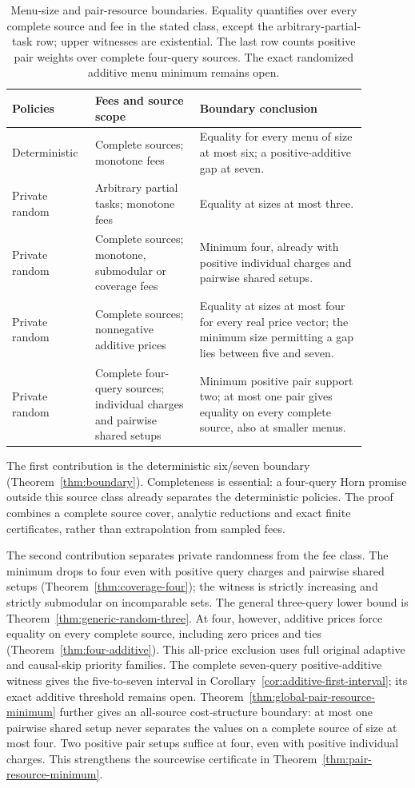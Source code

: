 \documentclass[pdflatex,sn-mathphys-num]{sn-jnl}
\theoremstyle{thmstyleone}
\theoremstyle{thmstylethree}
\theoremstyle{thmstyletwo}
\begin{document}
\begin{table}[ht]
\centering\small
\begin{tabular}{@{}p{0.18\linewidth}p{0.27\linewidth}p{0.43\linewidth}@{}}
\toprule
Policies & Fees and source scope & Boundary conclusion\\
\midrule
Deterministic & Complete sources; monotone fees
& Equality for every menu of size at most six; a positive-additive gap at seven.\\[3pt]
Private random & Arbitrary partial tasks; monotone fees
& Equality at sizes at most three.\\[3pt]
Private random & Complete sources; monotone, submodular or coverage fees
& Minimum four, already with positive individual charges and pairwise shared setups.\\[3pt]
Private random & Complete sources; nonnegative additive prices
& Equality at sizes at most four for every real price vector; the minimum size permitting a gap lies between five and seven.\\[3pt]
Private random & Complete four-query sources; individual charges and pairwise shared setups
& Minimum positive pair support two; at most one pair gives equality on every complete source, also at smaller menus.\\
\bottomrule
\end{tabular}
\caption{Menu-size and pair-resource boundaries. Equality quantifies
over every complete source and fee in the stated class, except the
arbitrary-partial-task row; upper witnesses are existential. The last row
counts positive pair weights over complete four-query sources. The exact
randomized additive menu minimum remains open.}
\label{tab:core-boundaries}
\end{table}

The first contribution is the deterministic six/seven boundary
(Theorem~\ref{thm:boundary}). Completeness is essential: a four-query Horn
promise outside this source class already separates the deterministic
policies. The proof combines a complete source cover, analytic reductions
and exact finite certificates, rather than extrapolation from sampled fees.

The second contribution separates private randomness from the fee class.
The minimum drops to four even with positive query charges and pairwise
shared setups (Theorem~\ref{thm:coverage-four}); the witness is strictly
increasing and strictly submodular on incomparable sets. The general
three-query lower bound is Theorem~\ref{thm:generic-random-three}.
At four, however, additive prices force equality on every complete source,
including zero prices and ties (Theorem~\ref{thm:four-additive}). This
all-price exclusion uses full original adaptive and causal-skip priority
families. The complete seven-query positive-additive witness gives the
five-to-seven interval in Corollary~\ref{cor:additive-first-interval};
its exact additive threshold remains open.
Theorem~\ref{thm:global-pair-resource-minimum} further gives an all-source
cost-structure boundary: at most one pairwise shared setup never separates
the values on a complete source of size at most four. Two positive pair
setups suffice at four, even with positive individual charges. This
strengthens the sourcewise certificate in
Theorem~\ref{thm:pair-resource-minimum}.
\end{document}
